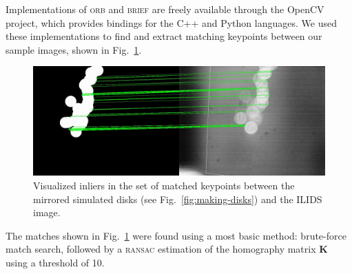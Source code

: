 \documentclass[11.5pt,oneside]{book}
\newcommand*{\figref}[1]{Fig.~\ref{#1}}
\begin{document}
Implementations of \textsc{orb} and \textsc{brief} are freely available through
the OpenCV project, which provides bindings for the C++ and Python languages. We
used these implementations to find and extract matching keypoints between our
sample images, shown in \figref{fig:matching}.

\begin{figure}
    \centering
    \includegraphics[width=\textwidth]{img/orb/asift-matching.jpg}
    \caption{Visualized inliers in the set of matched keypoints between the
    mirrored simulated disks (see \figref{fig:making-disks}) and the ILIDS image. \label{fig:matching}}
\end{figure}

The matches shown in \figref{fig:matching} were found using a most basic
method: brute-force match search, followed by a \textsc{ransac} estimation of the
homography matrix $\mathbf{K}$ using a threshold of 10.
\end{document}
